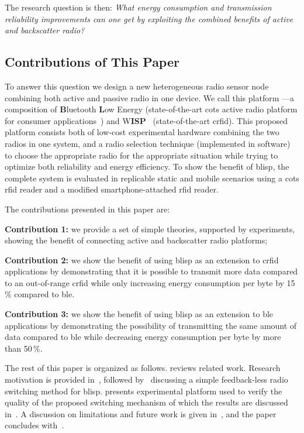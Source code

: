 \documentclass[conference,letterpaper,twoside,final,10pt]{IEEEtran}
\begin{document}
The research question is then:
\textit{What energy consumption and transmission reliability improvements can one get by exploiting the combined benefits of active and backscatter radio?}

\subsection{Contributions of This Paper}
\label{sec:introduction/contributions}

To answer this question we design a new heterogeneous radio sensor node combining both active and passive radio in one device.
We call this platform ---a composition of \textbf{B}luetooth \textbf{L}ow Energy (state-of-the-art \ac{cots} active radio platform for consumer applications~\cite{gomez2012sensors}) and W\textbf{ISP}~\cite{wiki2015wisp5} (state-of-the-art \ac{crfid}).
This proposed platform consists both of low-cost experimental hardware combining the two radios in one system, and a radio selection technique (implemented in software) to choose the appropriate radio for the appropriate situation while trying to optimize both reliability and energy efficiency.
To show the benefit of \ac{blisp}, the complete system is evaluated in replicable static and mobile scenarios using a \ac{cots} \ac{rfid} reader and a modified smartphone-attached \ac{rfid} reader.

The contributions presented in this paper are:

\textbf{Contribution 1:} we provide a set of simple theories, supported by experiments, showing the benefit of connecting active and backscatter radio platforms;

\textbf{Contribution 2:} we show the benefit of using \ac{blisp} as an extension to \ac{crfid} applications by demonstrating that it is possible to transmit more data compared to an out-of-range \ac{crfid} while only increasing energy consumption per byte by 15\,\% compared to \ac{ble}.

\textbf{Contribution 3:} we show the benefit of using \ac{blisp} as an extension to \ac{ble} applications by demonstrating the possibility of transmitting the same amount of data compared to \ac{ble} while decreasing energy consumption per byte by more than 50\,\%.

The rest of this paper is organized as follows.
 reviews related work.
Research motivation is provided in~, followed by~ discussing a simple feedback-less radio switching method for \ac{blisp}.
 presents experimental platform used to verify the quality of the proposed switching mechanism of which the results are discussed in~.
A discussion on limitations and future work is given in~, and the paper concludes with~.
\end{document}
